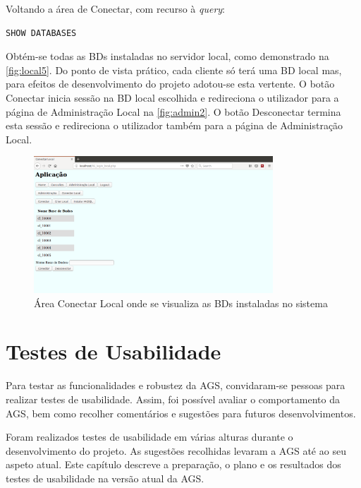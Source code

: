 \documentclass[11pt,twoside,a4paper]{report}
\begin{document}
Voltando a área de Conectar, com recurso à \textit{query}:
\begin{lstlisting}[language = SQL]
	SHOW DATABASES
\end{lstlisting}
Obtém-se todas as BDs instaladas no servidor local, como demonstrado na \autoref{fig:local5}. Do ponto de vista prático, cada cliente só terá uma BD local mas, para efeitos de desenvolvimento do projeto adotou-se esta vertente. O botão Conectar inicia sessão na BD local escolhida e redireciona o utilizador para a página de Administração Local na \autoref{fig:admin2}. O botão Desconectar termina esta sessão e redireciona o utilizador também para a página de Administração Local.
\begin{figure}[H]
	\begin{center}
		\includegraphics[trim={0 3cm 0 0},clip,width=0.8\textwidth]{local05} %
		\caption[Área Conectar Local com BDs locais]{Área Conectar Local onde se visualiza as BDs instaladas no sistema}
		\label{fig:local5}
	\end{center}
\end{figure}

\cleardoublepage
\chapter{Testes de Usabilidade}
\label{chap:usabilidade}
Para testar as funcionalidades e robustez da AGS, convidaram-se pessoas para realizar testes de usabilidade. Assim, foi possível avaliar o comportamento da AGS, bem como recolher comentários e sugestões para futuros desenvolvimentos.\par 
Foram realizados testes de usabilidade em várias alturas durante o desenvolvimento do projeto. As sugestões recolhidas levaram a AGS até ao seu aspeto atual. Este capítulo descreve a preparação, o plano e os resultados dos testes de usabilidade na versão atual da AGS.
\end{document}
